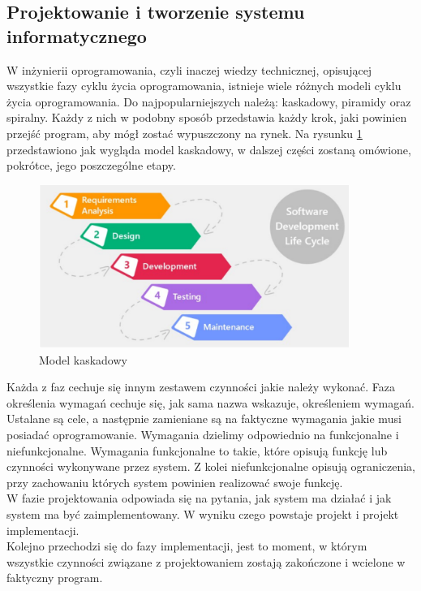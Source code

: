\documentclass[12pt]{article}
\begin{document}
\begin{sloppypar}
{  \subsection{Projektowanie i tworzenie systemu informatycznego}
  {
    W inżynierii oprogramowania, czyli inaczej wiedzy technicznej, opisującej wszystkie fazy cyklu życia oprogramowania, istnieje wiele różnych modeli 
    cyklu życia oprogramowania. Do najpopularniejszych należą: kaskadowy, piramidy oraz spiralny. Każdy z nich w podobny sposób przedstawia każdy krok, 
    jaki powinien przejść program, aby mógł zostać wypuszczony na rynek. Na rysunku \ref{fig:cascade} przedstawiono jak wygląda model kaskadowy, w dalszej części zostaną 
    omówione, pokrótce, jego poszczególne etapy.
    \begin{figure}[H]
      \centering
      \includegraphics[width=0.9\textwidth]{model_kaskadowy}
      \caption{Model kaskadowy \cite{cascade}}
      \label{fig:cascade}
    \end{figure}
    Każda z faz cechuje się innym zestawem czynności jakie należy wykonać. 
    Faza określenia wymagań cechuje się, jak sama nazwa wskazuje, określeniem wymagań. Ustalane są cele, a następnie zamieniane są na faktyczne wymagania 
    jakie musi posiadać oprogramowanie. Wymagania dzielimy odpowiednio na funkcjonalne i niefunkcjonalne. 
    Wymagania funkcjonalne to takie, które opisują funkcję lub czynności wykonywane przez system. 
    Z kolei niefunkcjonalne opisują ograniczenia, przy zachowaniu których system powinien realizować swoje funkcję.\\
    W fazie projektowania odpowiada się na pytania, jak system ma działać i jak system ma być zaimplementowany. W wyniku czego powstaje projekt i projekt implementacji.\\
    Kolejno przechodzi się do fazy implementacji, jest to moment, w którym wszystkie czynności związane z projektowaniem zostają zakończone i wcielone w faktyczny program.\\
}}
\end{sloppypar}
\end{document}
